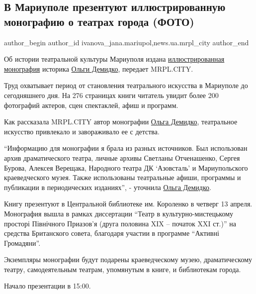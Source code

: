  
 
 
 
 
 
\subsection{В Мариуполе презентуют иллюстрированную монографию о театрах города (ФОТО)}
\label{sec:11_04_2017.stz.news.ua.mrpl_city.1.mariupol_prezentacia_monografia_demidko}
 
\ifcmt
 author_begin
   author_id ivanova_jana.mariupol,news.ua.mrpl_city
 author_end
\fi

Об истории театральной культуры Мариуполя издана
\href{https://archive.org/details/book.2017.demidko_olga.monografia.illustrovana_istoria_teatr_kultury_mariupolja}{иллюстрированная
монография} историка \href{\urlDemidkoIA}{Ольги Демидко}, передает MRPL.CITY.

Труд охватывает период от становления театрального искусства в Мариуполе до
сегодняшнего дня. На 276 страницах книги читатель увидит более 200 фотографий
актеров, сцен спектаклей, афиш и программ.

Как рассказала MRPL.CITY автор монографии \href{\urlDemidkoIA}{Ольга Демидко}, театральное искусство
привлекало и завораживало ее с детства.

\enquote{Информацию для монографии я брала из разных источников. Был использован архив
драматического театра, личные архивы Светланы Отченашенко, Сергея Бурова,
Алексея Верещака, Народного театра ДК \enquote{Азовсталь} и Мариупольского
краеведческого музея. Также использованы театральные афиши, программы и
публикации в периодических изданиях}, - уточнила \href{\urlDemidkoIA}{Ольга Демидко}.

Книгу презентуют в Центральной библиотеке им. Короленко в четверг 13 апреля.
Монография вышла в рамках диссертации \enquote{Театр в культурно-мистецькому просторі
Північного Приазов'я (друга половина XIX – початок XXI ст.)} на средства
Британского совета, благодаря участии в программе \enquote{Активні Громадяни}.

Экземпляры монографии будут подарены краеведческому музею, драматическому
театру, самодеятельным театрам, упомянутым в книге, и библиотекам города.

Начало презентации в 15:00.
